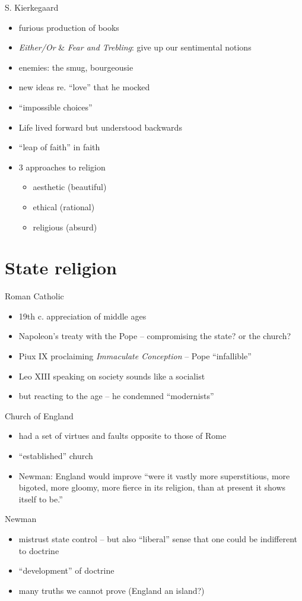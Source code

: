 \begin{frame}[label=sec-2-3]{S. Kierkegaard}
\begin{itemize}
\item furious production of books
\item \emph{Either/Or} \& \emph{Fear and Trebling}: give up our sentimental notions
\item enemies: the smug, bourgeousie
\item new ideas re. ``love'' that he mocked
\item ``impossible choices''
\item Life lived forward but understood backwards
\item ``leap of faith'' in faith
\item 3 approaches to religion
\begin{itemize}
\item aesthetic (beautiful)
\item ethical (rational)
\item religious (absurd)
\end{itemize}
\end{itemize}
\end{frame}
\section{State religion}
\label{sec-3}
\begin{frame}[label=sec-3-1]{Roman Catholic}
\begin{itemize}
\item 19th c. appreciation of middle ages
\item Napoleon's treaty with the Pope -- compromising the state? or the church?
\item Piux IX proclaiming \emph{Immaculate Conception} -- Pope ``infallible''
\item Leo XIII speaking on society sounds like a socialist
\item but reacting to the age -- he condemned ``modernists''
\end{itemize}
\end{frame}
\begin{frame}[label=sec-3-2]{Church of England}
\begin{itemize}
\item had a set of virtues and faults opposite to those of Rome
\item ``established'' church
\item Newman: England would improve ``were it vastly more superstitious, more bigoted, more gloomy, more fierce in its religion, than at present it shows itself to be.''
\end{itemize}
\end{frame}
\begin{frame}[label=sec-3-3]{Newman}
\begin{itemize}
\item mistrust state control -- but also ``liberal'' sense that one could be indifferent to doctrine
\item ``development'' of doctrine
\item many truths we cannot prove (England an island?)
\end{itemize}
\end{frame}
